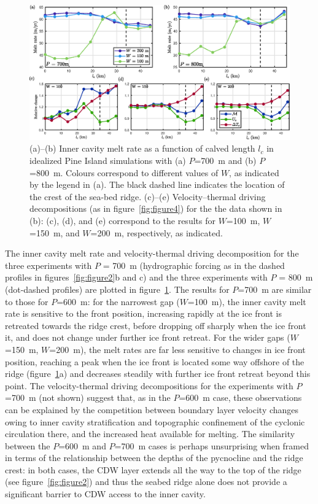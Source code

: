 \documentclass[draft]{agujournal2019}
\begin{document}
\begin{figure}
    \centering
    \includegraphics[width = \textwidth]{../make_figures/plots/figure8.eps}
    \caption{(a)--(b) Inner cavity melt rate as a function of calved length $l_c$ in idealized Pine Island simulations with (a) $P$=700~m and (b) $P$=800~m. Colours correspond to different values of $W$, as indicated by the legend in (a). The black dashed line indicates the location of the crest of the sea-bed ridge. (c)--(e) Velocity--thermal driving decompositions (as in figure~\ref{fig:figure4}) for the the data shown in (b): (c), (d), and (e) correspond to the results for $W$=100~m, $W$=150~m, and $W$=200~m, respectively, as indicated.}
    \label{fig:figure8}
\end{figure}


The inner cavity melt rate and velocity-thermal driving decomposition for the three experiments with $P$ = 700~m (hydrographic forcing as in the dashed profiles in figures~\ref{fig:figure2}b and c) and the three experiments with $P$ = 800~m (dot-dashed profiles) are plotted in figure~\ref{fig:figure8}. The results for $P$=700~m are similar to those for $P$=600~m: for the narrowest gap ($W$=100~m), the inner cavity melt rate is sensitive to the front position, increasing rapidly at the ice front is retreated towards the ridge crest, before dropping off sharply when the ice front it, and does not change under further ice front retreat. For the wider gaps ($W$=150~m, $W$=200~m), the melt rates are far less sensitive to changes in ice front position, reaching a peak when the ice front is located some way offshore of the ridge (figure~\ref{fig:figure8}a) and decreases steadily with further ice front retreat beyond this point. The velocity-thermal driving decompositions for the experiments with $P$=700~m (not shown) suggest that, as in the $P$=600~m case, these observations can be explained by the competition between boundary layer velocity changes owing to inner cavity stratification and topographic confinement of the cyclonic circulation there, and the increased heat available for melting. The similarity between the $P$=600~m and $P$=700~m cases is perhaps unsurprising when framed in terms of the relationship between the depths of the pycnocline and the ridge crest: in both cases, the CDW layer extends all the way to the top of the ridge (see figure~\ref{fig:figure2}) and thus the seabed ridge alone does not provide a significant barrier to CDW access to the inner cavity.
\end{document}
